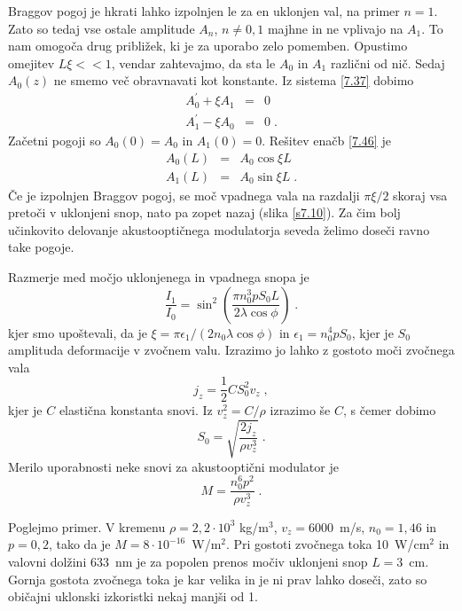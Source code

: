 \documentclass[11pt,fleqn]{book} %
\begin{document}
Braggov pogoj je hkrati lahko izpolnjen le za en uklonjen val, na
primer $n=1$. Zato so tedaj vse ostale amplitude $A_{n}$, $n\ne0,1$
majhne in ne vplivajo na $A_{1}$. To nam omogoča drug približek,
ki je za uporabo zelo pomemben. Opustimo omejitev $L\xi<<1$, vendar
zahtevajmo, da sta le $A_{0}$ in $A_{1}$ različni od nič. Sedaj
$A_{0}(z)$ ne smemo več obravnavati kot konstante. Iz sistema \ref{7.37}
dobimo 
\begin{eqnarray}
A_{0}^{\prime}+\xi A_{1} & = & 0\nonumber \\
A_{1}^{\prime}-\xi A_{0} & = & 0\;.
\end{eqnarray}
 Začetni pogoji so $A_{0}(0)=A_{0}$ in $A_{1}(0)=0$. Rešitev enačb
\ref{7.46} je 
\begin{eqnarray}
A_{0}(L) & = & A_{0}\cos\xi L\nonumber \\
A_{1}(L) & = & A_{0}\sin\xi L\;.
\end{eqnarray}
 Če je izpolnjen Braggov pogoj, se moč vpadnega vala na razdalji $\pi\xi/2$
skoraj vsa pretoči v uklonjeni snop, nato pa zopet nazaj (slika \ref{s7.10}).
Za čim bolj učinkovito delovanje akustooptičnega modulatorja seveda
želimo doseči ravno take pogoje.

Razmerje med močjo uklonjenega in vpadnega snopa je 
\begin{equation}
\frac{I_{1}}{I_{0}}=\sin^{2}\left(\frac{\pi n_{0}^{3}pS_{0}L}{2\lambda\cos\phi}\right)\;.\label{7.48}
\end{equation}
 kjer smo upoštevali, da je $\xi=\pi\epsilon_{1}/(2n_{0}\lambda\cos\phi)$
in $\epsilon_{1}=n_{0}^{4}pS_{0}$, kjer je $S_{0}$ amplituda deformacije
v zvočnem valu. Izrazimo jo lahko z gostoto moči zvočnega vala 
\begin{equation}
j_{z}=\frac{1}{2}CS_{0}^{2}v_{z}\;,\label{7.49}
\end{equation}
 kjer je $C$ elastična konstanta snovi. Iz $v_{z}^{2}=C/\rho$ izrazimo
še $C$, s čemer dobimo 
\begin{equation}
S_{0}=\sqrt{\frac{2j_{z}}{\rho v_{z}^{3}}}\;.\label{7.50}
\end{equation}
 Merilo uporabnosti neke snovi za akustooptični modulator je 
\begin{equation}
M=\frac{n_{0}^{6}p^{2}}{\rho v_{z}^{3}}\;.\label{7.51}
\end{equation}


Poglejmo primer. V kremenu $\rho=2,2\cdot10^{3}$ kg/m$^{3}$, $v_{z}=6000$~m/s,
$n_{0}=1,46$ in $p=0,2$, tako da je $M=8\cdot10^{-16}$~W/m$^{2}$.
Pri gostoti zvočnega toka 10~W/cm$^{2}$ in valovni dolžini 633~nm
je za popolen prenos močiv uklonjeni snop $L=3$~cm. Gornja gostota
zvočnega toka je kar velika in je ni prav lahko doseči, zato so običajni
uklonski izkoristki nekaj manjši od 1.
\end{document}
